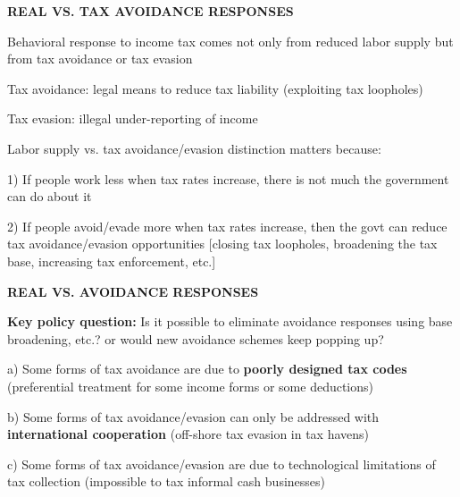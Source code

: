 \documentclass[landscape]{slides}
\begin{document}
\begin{slide}
\begin{center}
{\bf REAL VS. TAX AVOIDANCE RESPONSES}
\end{center}
Behavioral response to income tax comes not only from reduced
labor supply but from tax avoidance or tax evasion

Tax avoidance: legal means to reduce tax liability (exploiting tax loopholes)

Tax evasion: illegal under-reporting of income 

%

Labor supply vs. tax avoidance/evasion distinction matters because:

1) If people work less when tax rates increase, there is not much the government can do about 
it

2) If people avoid/evade more when tax rates increase, then the govt can reduce tax avoidance/evasion 
opportunities [closing tax loopholes, broadening the tax base, increasing tax enforcement, etc.]

%
%


\end{slide}

\begin{slide}
\begin{center}
{\bf REAL VS. AVOIDANCE RESPONSES}
\end{center}
{\bf Key policy question:} Is it possible to eliminate avoidance responses using base broadening, etc.? or would new avoidance schemes keep popping up?

a) Some forms of tax avoidance are due to \textbf{poorly designed tax codes} (preferential treatment for some income forms or some deductions)

b) Some forms of tax avoidance/evasion can only be addressed with \textbf{international cooperation} (off-shore
tax evasion in tax havens)

c) Some forms of tax avoidance/evasion are due to technological limitations of tax collection
(impossible to tax informal cash businesses)

\end{slide}
\end{document}
